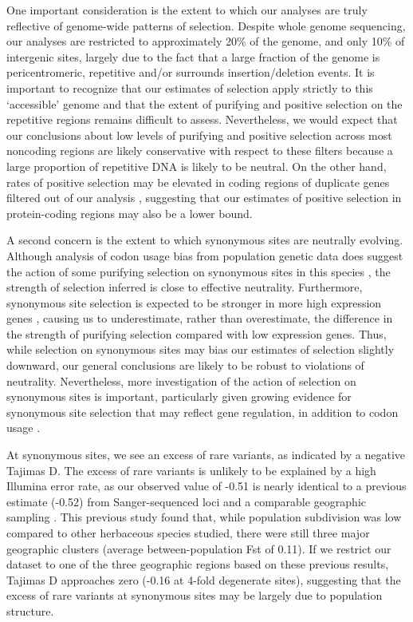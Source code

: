One important consideration is the extent to which our analyses are truly reflective of genome-wide patterns of selection. Despite whole genome sequencing, our analyses are restricted to approximately 20\% of the genome, and only 10\% of intergenic sites, largely due to the fact that a large fraction of the genome is pericentromeric, repetitive and/or surrounds insertion/deletion events. It is important to recognize that our estimates of selection apply strictly to this ‘accessible’ genome and that the extent of purifying and positive selection on the repetitive regions remains difficult to assess. Nevertheless, we would expect that our conclusions about low levels of purifying and positive selection across most noncoding regions are likely conservative with respect to these filters because a large proportion of repetitive DNA is likely to be neutral. On the other hand, rates of positive selection may be elevated in coding regions of duplicate genes filtered out of our analysis \citep{han2009}, suggesting that our estimates of positive selection in protein-coding regions may also be a lower bound.   

A second concern is the extent to which synonymous sites are neutrally evolving. Although analysis of codon usage bias from population genetic data does suggest the action of some purifying selection on synonymous sites in this species \citep{qiu2011}, the strength of selection inferred is close to effective neutrality. Furthermore, synonymous site selection is expected to be stronger in more high expression genes \citep{park2013,wright2004}, causing us to underestimate, rather than overestimate, the difference in the strength of purifying selection compared with low expression genes. Thus, while selection on synonymous sites may bias our estimates of selection slightly downward, our general conclusions are likely to be robust to violations of neutrality. Nevertheless, more investigation of the action of selection on synonymous sites is important, particularly given growing evidence for synonymous site selection that may reflect gene regulation, in addition to codon usage \citep{duret1999,marais2001}.

At synonymous sites, we see an excess of rare variants, as indicated by a negative Tajima\textsc{}s D. The excess of rare variants is unlikely to be explained by a high Illumina error rate, as our observed value of -0.51 is nearly identical to a previous estimate (-0.52) from Sanger-sequenced loci and a comparable geographic sampling \citep{St_onge2011-jz}. This previous study found that, while population subdivision was low compared to other herbaceous species studied, there were still three major geographic clusters (average between-population Fst of 0.11). If we restrict our dataset to one of the three geographic regions based on these previous results, Tajima\textsc{}s D approaches zero (-0.16 at 4-fold degenerate sites), suggesting that the excess of rare variants at synonymous sites may be largely due to population structure. 

